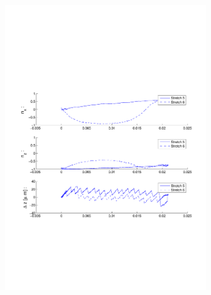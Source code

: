 \begin{figure}[ H]

\centering

\includegraphics[width=0.8\textwidth]{Images/Particle 2/Stretch5.pdf}

\end{figure}

